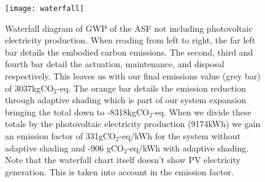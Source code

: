 \begin{figure}[H]
\begin{center}
\texttt{[image: waterfall]}
\caption{Waterfall diagram of GWP of the ASF not including photovoltaic electricity production. When reading from left to right, the far left bar details the embodied carbon emissions. The second, third and fourth bar detail the actuation, maintenance, and disposal respectively. This leaves us with our final emissions value (grey bar) of 3037kgCO$_2$-eq. The orange bar details the emission reduction through adaptive shading which is part of our system expansion bringing the total down to -8318kgCO$_2$-eq. When we divide these totals by the photovoltaic electricity production (9174kWh) we gain an emission factor of 331gCO$_2$-eq/kWh for the system without adaptive shading and -906 gCO$_2$-eq/kWh with adaptive shading. Note that the waterfall chart itself doesn't show PV electricity generation. This is taken into account in the emission factor.}

\label{fig:waterfall}
\end{center}
\end{figure}




 

